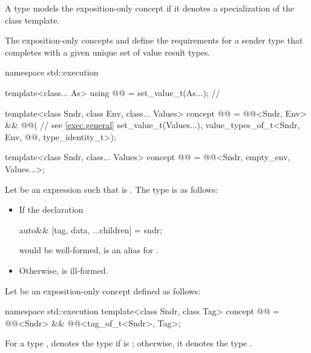 \pnum
A type models
the exposition-only concept 
if it denotes a specialization of
the  class template.

\pnum
The exposition-only concepts
 and 
define the requirements for a sender type
that completes with a given unique set of value result types.
\begin{codeblock}
namespace std::execution {
  template<class... As>
    using @@ = set_value_t(As...);             // \expos

  template<class Sndr, class Env, class... Values>
    concept @@ =
      @@<Sndr, Env> &&
      @@(                     // see \ref{exec.general}
        set_value_t(Values...),
        value_types_of_t<Sndr, Env, @@, type_identity_t>);

  template<class Sndr, class... Values>
    concept @@ = @@<Sndr, empty_env, Values...>;
}
\end{codeblock}

\pnum
Let  be an expression
such that  is .
The type  is as follows:
\begin{itemize}
\item
If the declaration
\begin{codeblock}
auto&& [tag, data, ...children] = sndr;
\end{codeblock}
would be well-formed,  is
an alias for .
\item
Otherwise,  is ill-formed.
\end{itemize}

\pnum
Let  be an exposition-only concept defined as follows:
\begin{codeblock}
namespace std::execution {
  template<class Sndr, class Tag>
  concept @@ =
    @@<Sndr> &&
    @@<tag_of_t<Sndr>, Tag>;
}
\end{codeblock}

\pnum
For a type ,
 denotes the type 
if  is \cv{} ;
otherwise, it denotes the type .

